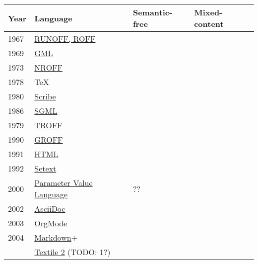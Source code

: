 \documentclass{scrreprt}
\begin{document}
\begin{tabular}{ l | l | l | l }
  \textbf{Year} &
  \textbf{Language} &
  \textbf{Semantic-free} &
  \textbf{Mixed-content}
  \\ \hline

  1967 &
  \href{http://en.wikipedia.org/wiki/RUNOFF}{RUNOFF, ROFF}

  \\ \hline
  1969 &
  \href{http://en.wikipedia.org/wiki/IBM_Generalized_Markup_Language}{GML}

  \\ \hline
  1973 &
  \href{http://en.wikipedia.org/wiki/Nroff}{NROFF}

  \\ \hline
  1978 &
  TeX

  \\ \hline
  1980 &
  \href{http://www.dtic.mil/docs/citations/ADA125287}{Scribe}

  \\ \hline
  1986 &
  \href{http://en.wikipedia.org/wiki/SGML}{SGML}

  \\ \hline
  1979 &
  \href{http://www.troff.org/history.html}{TROFF}

  \\ \hline
  1990 &
  \href{http://en.wikipedia.org/wiki/Groff_(software)}{GROFF}

  \\ \hline
  1991 &
  \href{http://alistapart.com/article/a-brief-history-of-markup}{HTML}

  \\ \hline
  1992 &
  \href{http://en.wikipedia.org/wiki/Setext}{Setext}


  \\ \hline
  2000
  & \href{http://public.ccsds.org/publications/archive/641x0b2.pdf}{Parameter Value Language}
  & ??

  \\ \hline
  2002 &
  \href{http://en.wikipedia.org/wiki/Asciidoc}{AsciiDoc}

  \\ \hline
  2003 &
  \href{http://en.wikipedia.org/wiki/Org-mode}{OrgMode}

  \\ \hline
  2004 &
  \href{http://en.wikipedia.org/wiki/Markdown}{Markdown}+


  \\ \hline
  &
  \href{http://en.wikipedia.org/wiki/Textile_(markup_language)}{Textile 2} (TODO: 1?)
\end{tabular}
\end{document}
